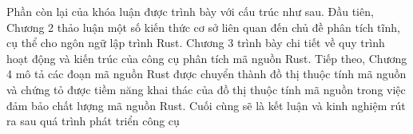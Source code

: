 Phần còn lại của khóa luận được trình bày với cấu trúc như sau.
Đầu tiên, Chương 2 thảo luận một số kiến thức cơ sở liên quan đến chủ đề phân tích tĩnh, cụ thể cho ngôn ngữ lập trình Rust.
Chương 3 trình bày chi tiết về quy trình hoạt động và kiến trúc của công cụ phân tích mã nguồn Rust.
Tiếp theo, Chương 4 mô tả các đoạn mã nguồn Rust được chuyển thành đồ thị thuộc tính mã nguồn và chứng tỏ được tiềm năng khai thác của đồ thị thuộc tính mã nguồn trong việc đảm bảo chất lượng mã nguồn Rust.
Cuối cùng sẽ là kết luận và kinh nghiệm rút ra sau quá trình phát triển công cụ
